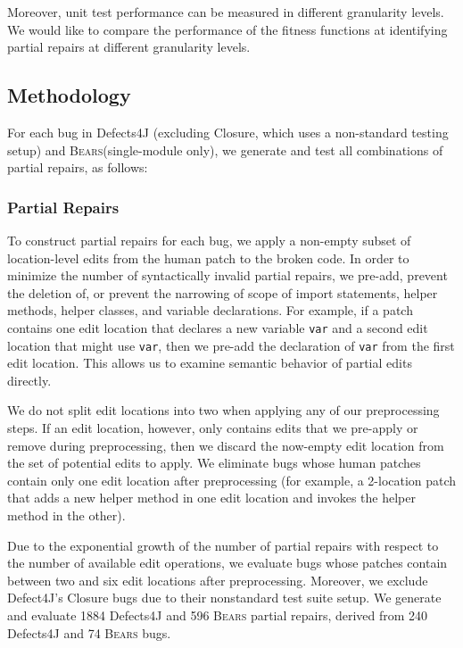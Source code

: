 \documentclass[10pt, conference]{IEEEtran}
\newcommand\bears{\textsc{Bears}\xspace}
\begin{document}
Moreover, unit test performance can be measured in different granularity levels. 
We would like to compare the performance of the fitness functions at identifying 
partial repairs at different granularity levels.


\subsection{Methodology}
\label{sec:partial-repair-methodology}

For each bug in Defects4J
(excluding Closure, which uses a non-standard testing setup)
and \bears (single-module only), we generate and test all combinations of partial repairs, as follows: 

\subsubsection{Partial Repairs}

To construct partial repairs for each bug, we apply a non-empty subset 
of location-level edits from the human patch to the broken code.
In order to minimize the number of syntactically invalid partial repairs, 
we pre-add, prevent the deletion of, or prevent the narrowing of scope of 
import statements, helper methods, helper classes, and variable declarations.
For example, if a patch contains one edit location that declares a new variable 
\texttt{var} and a second edit location that might use \texttt{var}, then we 
pre-add the declaration of \texttt{var} from the first edit location. 
This allows us to examine semantic behavior of partial edits directly.

We do not split edit locations into two when applying any of our preprocessing steps. 
If an edit location, however, only contains edits that we pre-apply or remove during 
preprocessing, then we discard the now-empty edit location from the set of 
potential edits to apply. We eliminate bugs whose human patches contain only 
one edit location after preprocessing (for example, a 2-location patch that adds a new 
helper method in one edit location and invokes the helper method in the other). 

Due to the exponential growth of the number of partial repairs with respect 
to the number of available edit operations, we evaluate bugs whose patches 
contain between two and six edit locations after preprocessing.
Moreover, we exclude Defect4J's Closure bugs due to 
their nonstandard test suite setup.
We generate and evaluate 1884 Defects4J and 596 \bears partial repairs,
derived from 240 Defects4J and 74 \bears bugs.
\end{document}
